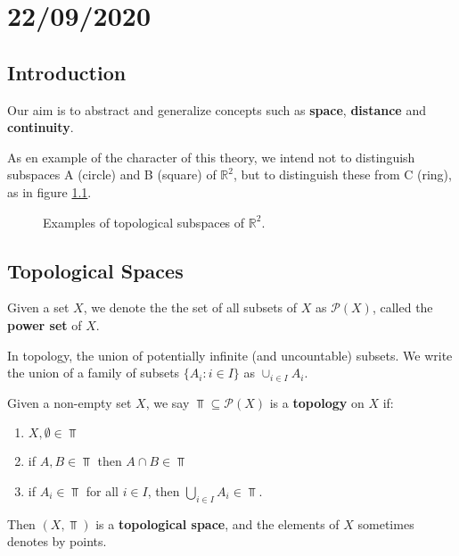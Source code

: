 \documentclass[../../main/main.tex]{subfiles}
\begin{document}
\chapter{22/09/2020}
\label{cpt:lec1}

\section{Introduction}
\label{sec:introduction}

Our aim is to abstract and generalize concepts such as {\bf space}, {\bf distance} and {\bf continuity}.

As en example of the character of this theory, we intend not to distinguish subspaces A (circle) and B (square) of $\mathbb{R}^{2}$, but to distinguish these from C (ring), as in figure \ref{fig:example-1}.

\begin{figure}[ht]
  \centering
  \caption{Examples of topological subspaces of $\mathbb{R}^{2}$.}
  \label{fig:example-1}
\end{figure}

\section{Topological Spaces}
\label{sec:top-spaces}

\begin{definition}
  Given a set $X$, we denote the the set of all subsets of $X$ as $\mathcal{P}(X)$, called the {\bf power set} of $X$.
\end{definition}

In topology, the union of potentially infinite (and uncountable) subsets. We write the union of a family of subsets $\{A_{i} : i \in I\}$ as $\cup_{i \in I} A_{i}$.

\begin{definition}
  \label{def:topology}
  Given a non-empty set $X$, we say $\Top \subseteq \mathcal{P}(X)$ is a {\bf topology} on $X$ if:
  \begin{enumerate}
      \item $X, \emptyset \in \Top$
      \item if $A, B \in \Top$ then $A \cap B \in \Top$
      \item if $A_{i} \in \Top$ for all $i \in I$, then $\bigcup_{i \in I} A_{i} \in \Top$.
  \end{enumerate}
  Then $(X, \Top)$ is a {\bf topological space}, and the elements of $X$ sometimes denotes by points.
\end{definition}
\end{document}
